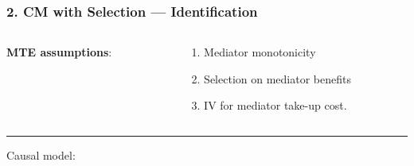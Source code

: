 \documentclass[dvipsnames]{beamer} %
\begin{document}
\begin{frame}
    \frametitle{2. CM with Selection --- Identification}
    \begin{columns}[T]
        \begin{column}{0.3\textwidth}
            \textbf{MTE assumptions}:
        \end{column}
        \begin{column}{0.6\textwidth}
            \vskip-0.25cm
            \begin{enumerate}
                \item Mediator monotonicity
                \item Selection on mediator benefits
                \item IV for mediator take-up cost.
            \end{enumerate}
        \end{column}
    \end{columns}
    \vskip0.25cm

    \par\noindent\rule{\textwidth}{0.4pt}
    Causal model:


\end{frame}
\end{document}
